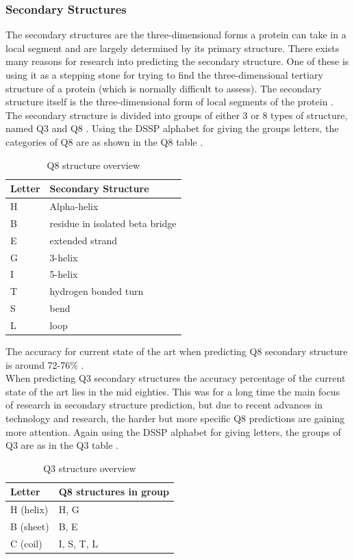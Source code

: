 \subsubsection{Secondary Structures}
The secondary structures are the three-dimensional forms a protein can take in a local segment and are largely determined by its primary structure. There exists many reasons for research into predicting the secondary structure. One of these is using it as a stepping stone for trying to find the three-dimensional tertiary structure of a protein (which is normally difficult to assess). The secondary structure itself is the three-dimensional form of local segments of the protein \citep[p.~2]{qi-et-al-2012}.
The secondary structure is divided into groups of either 3 or 8 types of structure, named Q3 and Q8 \citep{zhou-and-troyanskaya-2014}. 
Using the DSSP alphabet \citep{kabsch-and-sander-1983} 
for giving the groups letters, the categories of Q8 are as shown in the Q8 table \citep{qi-et-al-2012}.
\begin{table}[H]
\caption{Q8 structure overview}
\centering
\begin{tabular}{l|l}
\hline 
Letter	& Secondary Structure 			\\ \hline
H	& Alpha-helix						\\
B	& residue in isolated beta bridge	\\
E	& extended strand					\\
G	& 3-helix							\\
I	& 5-helix							\\
T	& hydrogen bonded turn				\\
S	& bend								\\
L	& loop								\\
\end{tabular}
\end{table}
\noindent The accuracy for current state of the art when predicting Q8 secondary structure is around 72-76\% \citep{zhou-and-troyanskaya-2014, qi-et-al-2012, wang-et-al-2016}. \\
When predicting Q3 secondary structures the accuracy percentage of the current state of the art lies in the mid eighties. This was for a long time the main focus of research in secondary structure prediction, but due to recent advances in technology and research, the harder but more specific Q8 predictions are gaining more attention. 
Again using the DSSP alphabet for giving letters, the groups of Q3 are as in the Q3 table \citep{qi-et-al-2012}.
\begin{table}[H]
\caption{Q3 structure overview}
\centering
\begin{tabular}{l|l}
\hline
Letter		& Q8 structures in group	\\ \hline
H	(helix)		& H, G						\\
B	(sheet)		& B, E						\\
C (coil)	    & I, S, T, L				\\
\end{tabular}
\end{table}


